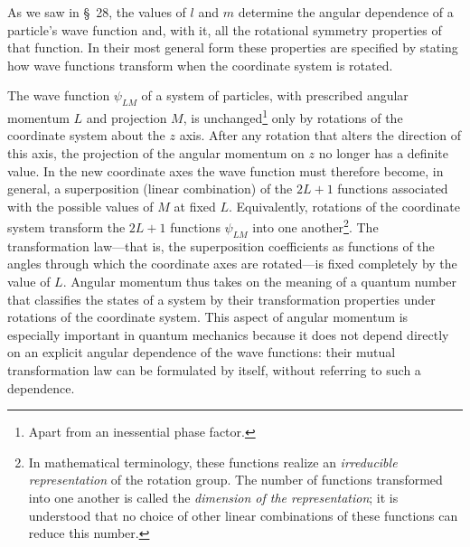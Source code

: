 As we saw in \S~28, the values of $l$ and $m$ determine the angular
dependence of a particle's wave function and, with it, all the rotational
symmetry properties of that function. In their most general form these
properties are specified by stating how wave functions transform when the
coordinate system is rotated.

The wave function $\psi_{LM}$ of a system of particles, with prescribed
angular momentum $L$ and projection $M$, is unchanged\footnote{Apart from an
inessential phase factor.} only by rotations of the coordinate system about
the $z$ axis. After any rotation that alters the direction of this axis, the
projection of the angular momentum on $z$ no longer has a definite value. In
the new coordinate axes the wave function must therefore become, in general,
a superposition (linear combination) of the $2L+1$ functions associated with
the possible values of $M$ at fixed $L$. Equivalently, rotations of the
coordinate system transform the $2L+1$ functions $\psi_{LM}$ into one
another\footnote{In mathematical terminology, these functions realize an
\emph{irreducible representation} of the rotation group. The number of
functions transformed into one another is called the \emph{dimension of the
representation}; it is understood that no choice of other linear
combinations of these functions can reduce this number.}. The transformation
law---that is, the superposition coefficients as functions of the angles
through which the coordinate axes are rotated---is
fixed completely by the value of $L$. Angular momentum thus takes on the
meaning of a quantum number that classifies the states of a system by their
transformation properties under rotations of the coordinate system. This
aspect of angular momentum is especially important in quantum mechanics
because it does not depend directly on an explicit angular dependence of the
wave functions: their mutual transformation law can be formulated by itself,
without referring to such a dependence.

